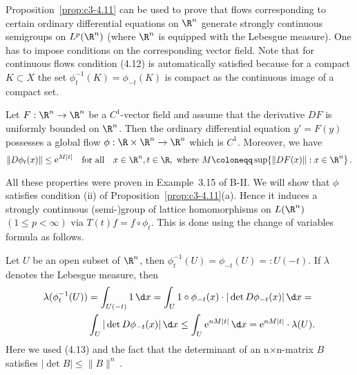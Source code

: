 Proposition~\ref{prop:c3-4.11} can be used to prove that flows corresponding to certain
ordinary differential equations on $\R ^n$ generate strongly continuous
semigroups on $L^p(\R ^n)$ (where $\R ^n$ is equipped with the Lebesgue
measure). One has to impose conditions on the corresponding vector
field. Note that for continuous flows condition (4.12) is automatically satisfied because for a compact $K \subset X$ the set $\phi_t^{-1}(K) = \phi_{-t}(K)$
is compact as the continuous image of a compact set.

\begin{example}\label{ex:c3-4.12}
Let $F : \R ^n \to \R ^n$ be a $C^1$-vector field and assume that
the derivative $DF$ is uniformly bounded on $\R ^n$. Then the ordinary
differential equation $y' = F(y)$ possesses a global flow
$\phi : \R  \times \R ^n \to \R ^n$ which is $C^1$. Moreover, we have
\begin{equation}\label{eq:c3-4.13}
	\|D\phi_t(x)\| \leq \mathrm{e}^{M|t|} \quad \text{for all} \quad x \in \R ^n, t \in \R , \text{ where }  M \coloneqq  \sup \{\|DF(x)\| : x \in \R ^n\}\,. 
\end{equation}

All these properties were proven in Example~3.15 of B-II.
We will show that $\phi$ satisfies condition (ii) of Proposition~\ref{prop:c3-4.11}(a). 
Hence it induces a strongly continuous (semi-)group of lattice homomorphisms
on $L(\R ^n)$ $(1 \leq p < \infty)$ via $T(t)f = f \circ \phi_t$.
This is done using the change of variables formula as follows.

Let $U$ be an open subset of $\R ^n$, then $\phi_t^{-1}(U) = \phi_{-t}(U) =: U(-t)$. 
If $\lambda$ denotes the Lebesgue measure, then
\begin{equation}\label{eq:c3-4.14}
	\begin{aligned}
		\lambda(\phi_t^{-1}(U)) &= \int_{U(-t)} 1 \, \d x  = \int_{U} 1 \circ \phi_{-t}(x) \cdot |\det D\phi_{-t}(x)| \, \d x  = \\
		&\int_{U} |\det D\phi_{-t}(x)| \, \d x  \leq \int_{U} \mathrm{e}^{nM|t|} \, \d x  = \mathrm{e}^{nM|t|} \cdot \lambda(U).
	\end{aligned}
\end{equation}
Here we used (4.13) and the fact that the determinant of an n$\times$n-matrix
$B$ satisfies $|\det B| \leq \|B\|^n$\,.
\end{example}

